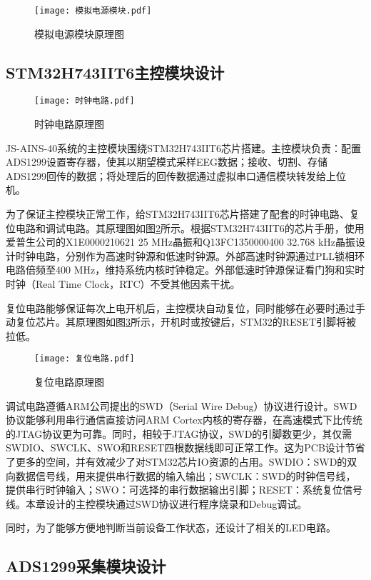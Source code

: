 \begin{figure}[h]
	\centering
	\texttt{[image: 模拟电源模块.pdf]}
	\caption{模拟电源模块原理图}
	\label{fig2-7}
\end{figure}

\subsection{STM32H743IIT6主控模块设计}
\begin{figure}[!h]
	\centering
	\texttt{[image: 时钟电路.pdf]}
	\caption{时钟电路原理图}
	\label{fig2-8}
\end{figure}

JS-AINS-40系统的主控模块围绕STM32H743IIT6芯片搭建。主控模块负责：配置ADS1299设置寄存器，使其以期望模式采样EEG数据；接收、切割、存储ADS1299回传的数据；将处理后的回传数据通过虚拟串口通信模块转发给上位机。

为了保证主控模块正常工作，给STM32H743IIT6芯片搭建了配套的时钟电路、复位电路和调试电路。其原理图如图\ref{fig2-8}所示。根据STM32H743IIT6的芯片手册，使用爱普生公司的X1E0000210621 25 MHz晶振和Q13FC1350000400 32.768 kHz晶振设计时钟电路，分别作为高速时钟源和低速时钟源。外部高速时钟源通过PLL锁相环电路倍频至400 MHz，维持系统内核时钟稳定。外部低速时钟源保证看门狗和实时时钟（Real Time Clock，RTC）不受其他因素干扰。


复位电路能够保证每次上电开机后，主控模块自动复位，同时能够在必要时通过手动复位芯片。其原理图如图\ref{fig2-9}所示，开机时或按键后，STM32的RESET引脚将被拉低。

\begin{figure}[!h]
	\centering
	\texttt{[image: 复位电路.pdf]}
	\caption{复位电路原理图}
	\label{fig2-9}
\end{figure}

调试电路遵循ARM公司提出的SWD（Serial Wire Debug）协议进行设计。SWD协议能够利用串行通信直接访问ARM Cortex内核的寄存器，在高速模式下比传统的JTAG协议更为可靠。同时，相较于JTAG协议，SWD的引脚数更少，其仅需SWDIO、SWCLK、SWO和RESET四根数据线即可正常工作。这为PCB设计节省了更多的空间，并有效减少了对STM32芯片IO资源的占用。SWDIO：SWD的双向数据信号线，用来提供串行数据的输入输出；SWCLK：SWD的时钟信号线，提供串行时钟输入；SWO：可选择的串行数据输出引脚；RESET：系统复位信号线。本章设计的主控模块通过SWD协议进行程序烧录和Debug调试。

同时，为了能够方便地判断当前设备工作状态，还设计了相关的LED电路。

\subsection{ADS1299采集模块设计}

